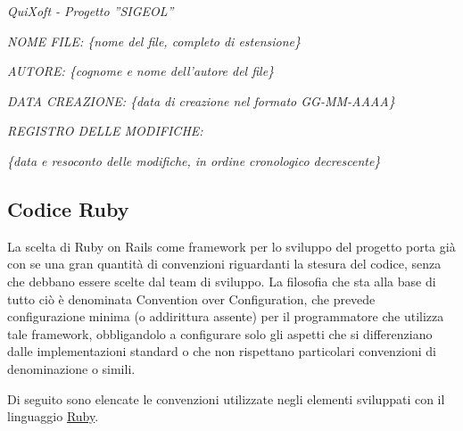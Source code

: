 \documentclass[11pt,a4paper]{article}
\begin{document}
\textit{QuiXoft - Progetto ''SIGEOL''}

\textit{NOME FILE: \{nome del file, completo di estensione\}}

\textit{AUTORE: \{cognome e nome dell'autore del file\}}

\textit{DATA CREAZIONE: \{data di creazione nel formato GG-MM-AAAA\}}

\textit{REGISTRO DELLE MODIFICHE:}

\textit{\{data e resoconto delle modifiche, in ordine cronologico decrescente\}}

\subsection{Codice Ruby}
La scelta di Ruby on Rails come framework per lo sviluppo del progetto porta già con se una gran quantità di convenzioni riguardanti la stesura del codice, senza che debbano essere scelte dal team di sviluppo.
La filosofia che sta alla base di tutto ciò è denominata Convention over Configuration, che prevede configurazione minima (o addirittura assente) per il programmatore che utilizza tale framework, obbligandolo a configurare solo gli aspetti che si differenziano dalle implementazioni standard o che non rispettano particolari convenzioni di denominazione o simili.

Di seguito sono elencate le convenzioni utilizzate negli elementi sviluppati
con il linguaggio \underline{Ruby}.
\end{document}
